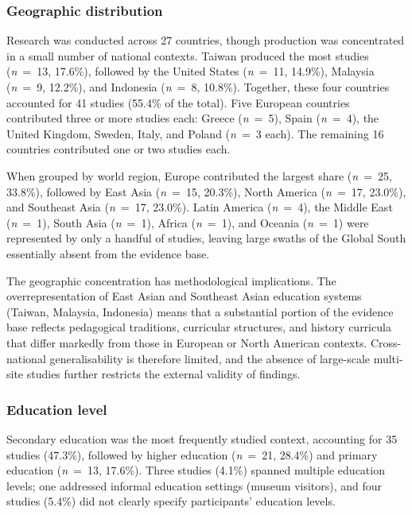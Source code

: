 \documentclass[etq]{acnsart}
\begin{document}
	\subsubsection{Geographic distribution}
	\label{sec:results_rq1_geography}
	
	Research was conducted across 27 countries, though production was concentrated in a small number of national contexts. Taiwan produced the most studies (\textit{n}~=~13, 17.6\%), followed by the United States (\textit{n}~=~11, 14.9\%), Malaysia (\textit{n}~=~9, 12.2\%), and Indonesia (\textit{n}~=~8, 10.8\%). Together, these four countries accounted for 41 studies (55.4\% of the total). Five European countries contributed three or more studies each: Greece (\textit{n}~=~5), Spain (\textit{n}~=~4), the United Kingdom, Sweden, Italy, and Poland (\textit{n}~=~3 each). The remaining 16 countries contributed one or two studies each.
	
	When grouped by world region, Europe contributed the largest share (\textit{n}~=~25, 33.8\%), followed by East Asia (\textit{n}~=~15, 20.3\%), North America (\textit{n}~=~17, 23.0\%), and Southeast Asia (\textit{n}~=~17, 23.0\%). Latin America (\textit{n}~=~4), the Middle East (\textit{n}~=~1), South Asia (\textit{n}~=~1), Africa (\textit{n}~=~1), and Oceania (\textit{n}~=~1) were represented by only a handful of studies, leaving large swaths of the Global South essentially absent from the evidence base.
	
	The geographic concentration has methodological implications. The overrepresentation of East Asian and Southeast Asian education systems (Taiwan, Malaysia, Indonesia) means that a substantial portion of the evidence base reflects pedagogical traditions, curricular structures, and history curricula that differ markedly from those in European or North American contexts. Cross-national generalisability is therefore limited, and the absence of large-scale multi-site studies further restricts the external validity of findings.
	
	\subsubsection{Education level}
	\label{sec:results_rq1_education}
	
	Secondary education was the most frequently studied context, accounting for 35 studies (47.3\%), followed by higher education (\textit{n}~=~21, 28.4\%) and primary education (\textit{n}~=~13, 17.6\%). Three studies (4.1\%) spanned multiple education levels; one addressed informal education settings (museum visitors), and four studies (5.4\%) did not clearly specify participants' education levels.
	
\end{document}
